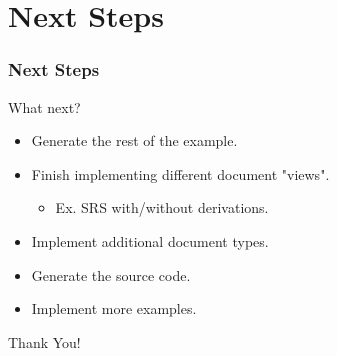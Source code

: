 \documentclass{beamer}
\begin{document}

\section[Next Steps]{Next Steps}


\begin{frame}

\frametitle{Next Steps}


\begin{Large}
What next?
\end{Large}

\begin{itemize}
\item Generate the rest of the example.
\item Finish implementing different document "views".
\begin{itemize}
\item Ex. SRS with/without derivations.
\end{itemize}
\item Implement additional document types.
\item Generate the source code. %
\item Implement more examples.
\end{itemize}
\end{frame}


\begin{frame}
\begin{center}
\Huge Thank You!
\end{center}
\end{frame}

\end{document}
